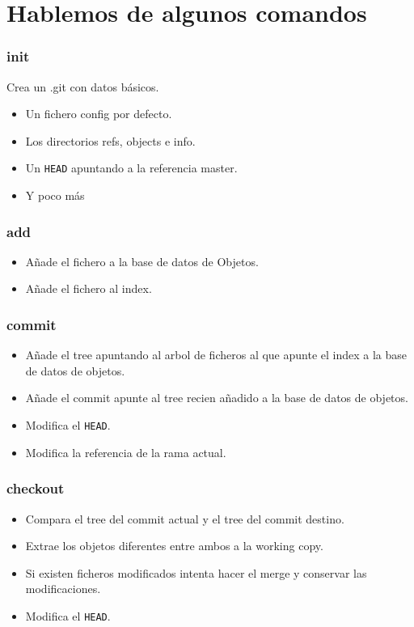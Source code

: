 \documentclass[10pt]{beamer}
\begin{document}
  \section*{Hablemos de algunos comandos}

  \begin{frame}[containsverbatim]
    \frametitle{init}
    Crea un .git con datos básicos.
    \begin{itemize}
      \item Un fichero config por defecto.
      \item Los directorios refs, objects e info.
      \item Un \verb+HEAD+ apuntando a la referencia master.
      \item Y poco más
    \end{itemize}
  \end{frame}

  \begin{frame}[containsverbatim]
    \frametitle{add}
    \begin{itemize}
      \item Añade el fichero a la base de datos de Objetos.
      \item Añade el fichero al index.
    \end{itemize}
  \end{frame}

  \begin{frame}[containsverbatim]
    \frametitle{commit}
    \begin{itemize}
      \item Añade el tree apuntando al arbol de ficheros al que apunte el index a la base de datos de objetos.
      \item Añade el commit apunte al tree recien añadido a la base de datos de objetos.
      \item Modifica el \verb+HEAD+.
      \item Modifica la referencia de la rama actual.
    \end{itemize}
  \end{frame}

  \begin{frame}[containsverbatim]
    \frametitle{checkout}
    \begin{itemize}
      \item Compara el tree del commit actual y el tree del commit destino.
      \item Extrae los objetos diferentes entre ambos a la working copy.
      \item Si existen ficheros modificados intenta hacer el merge y conservar las modificaciones.
      \item Modifica el \verb+HEAD+.
    \end{itemize}
  \end{frame}
\end{document}
